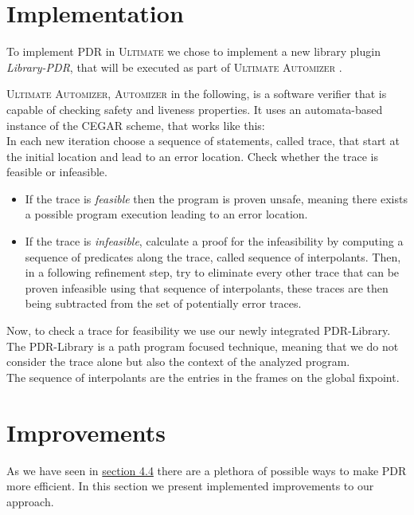 \documentclass[11pt, a4paper, BCOR=10mm, ngerman]{scrbook}
\begin{document}
\section{Implementation}
To implement PDR in \textsc{Ultimate} we chose to implement a new library plugin \textsl{Library-PDR}, that will be executed as part of \textsc{Ultimate Automizer} \cite{Heizmann:2013:SMC:2526861.2526864}. \par 
\textsc{Ultimate Automizer}, \textsc{Automizer} in the following, is a software verifier that is capable of checking safety and liveness properties. It uses an automata-based \cite{DBLP:conf/cav/HeizmannHP13} instance of the CEGAR scheme, that works like this: \\
 In each new iteration choose a sequence of statements, called trace, that start at the initial location and lead to an error location. Check whether the trace is feasible or infeasible.
 \begin{itemize}
	\item If the trace is \textsl{feasible} then the program is proven unsafe, meaning there exists a possible program execution leading to an error location.
	\item If the trace is \textsl{infeasible}, calculate a proof for the infeasibility by computing a sequence of predicates along the trace, called sequence of interpolants. Then, in a following refinement step, try to eliminate every other trace that can be proven infeasible using that sequence of interpolants, these traces are then being subtracted from the set of potentially error traces.
 \end{itemize}
 \par
 Now, to check a trace for feasibility we use our newly integrated PDR-Library. \\
 The PDR-Library is a path program focused technique, meaning that we do not consider the trace alone but also the context of the analyzed program. \\
 
 The sequence of interpolants are the entries in the frames on the global fixpoint.
 

\section{Improvements}
As we have seen in \hyperref[improvements]{section 4.4} there are a plethora of possible ways to make PDR more efficient. In this section we present implemented improvements to our approach.
\end{document}
